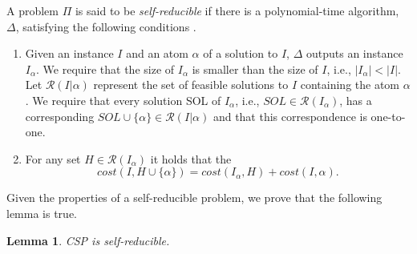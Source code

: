 \documentclass[journal]{acm_proc_article-sp}
\newtheorem{lemma}{Lemma}
\begin{document}
A problem $\Pi$ is said to be \textit{self-reducible} if there is a polynomial-time algorithm, $\Delta$, satisfying the following conditions \cite{Zych2012}.
\begin{enumerate}
\item Given an instance $I$ and an atom $\alpha$ of a solution to $I$, $\Delta$ outputs an instance $I_\alpha$. We require that the size of $I_\alpha$ is smaller than the size of $I$, i.e., $|I_\alpha| < |I|$. Let $\mathcal{R}(I|\alpha) $ represent the set of feasible solutions to $I$ containing  the atom $\alpha$. We require that every solution SOL of $I_\alpha$, i.e., $SOL \in \mathcal{R}(I_\alpha)$, has a corresponding $SOL \cup \{\alpha\} \in \mathcal{R}(I|\alpha)$ and that this correspondence is one-to-one.
\item For any set $H \in \mathcal{R}(I_\alpha)$ it holds that the 
$$cost(I, H \cup  \{\alpha\}) =   cost(I_\alpha, H)+ cost(I, \alpha).$$
\end{enumerate}

Given the properties of a self-reducible problem, we prove that the following lemma is true. 

\begin{lemma}
CSP is \textit{self-reducible}.
\end{lemma}
\end{document}

